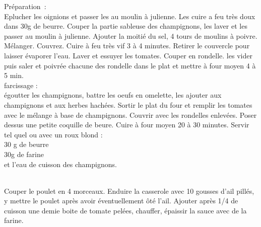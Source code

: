 \begin{minipage}[c]{\textwidth}
Préparation :\\
Eplucher les oignions et passer les au moulin à julienne. Les cuire a feu très doux dans 30g de beurre. Couper la partie sableuse des champignons, les laver et les passer au moulin à julienne. Ajouter la moitié du sel, 4 tours de moulins à poivre. Mélanger. Couvrez. Cuire à feu très vif 3 à 4 minutes. Retirer le couvercle pour laisser évaporer l'eau. Laver et essuyer les tomates. Couper en rondelle. les vider puis saler et poivrée chacune des rondelle dans le plat et mettre à four moyen 4 à 5 min.\\
farcissage :\\
égoutter les champignons, battre les oeufs en omelette, les ajouter aux champignons et aux herbes hachées. Sortir le plat du four et remplir les tomates avec le mélange à base de champignons. Couvrir avec les rondelles enlevées. Poser dessus une petite coquille de beure. Cuire à four moyen 20 à 30 minutes. Servir tel quel ou avec un roux blond :\\
30 g de beurre\\
30g de farine\\
et l'eau de cuisson des champignons.\\
\\

\end{minipage}

\begin{minipage}[c]{\textwidth}
Couper le poulet en 4 morceaux. Enduire la casserole avec 10 gousses d'ail pillés, y mettre le poulet après avoir éventuellement ôté l'ail. Ajouter après 1/4 de cuisson une demie boite de tomate pelées, chauffer, épaissir la sauce avec de la farine.\\
\\

\end{minipage}

